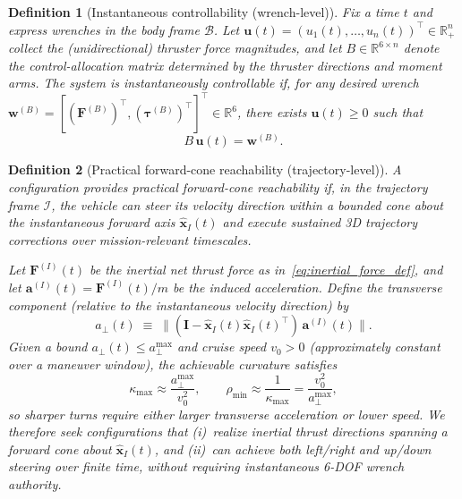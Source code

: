 \documentclass{article}
\newtheorem{definition}{Definition}
\begin{document}
\begin{definition}[Instantaneous controllability (wrench-level)]
\label{def:instant_control}
Fix a time $t$ and express wrenches in the body frame $\mathcal{B}$. Let $\mathbf{u}(t) = (u_1(t), \ldots, u_n(t))^\top \in \mathbb{R}_+^n$ collect the (unidirectional) thruster force magnitudes, and let $B \in \mathbb{R}^{6 \times n}$ denote the control-allocation matrix determined by the thruster directions and moment arms. The system is \emph{instantaneously controllable} if, for any desired wrench $\mathbf{w}^{(B)} = [(\mathbf{F}^{(B)})^\top, (\bm{\tau}^{(B)})^\top]^\top \in \mathbb{R}^6$, there exists $\mathbf{u}(t) \ge 0$ such that
\begin{equation}
B\,\mathbf{u}(t) = \mathbf{w}^{(B)}.
\end{equation}
\end{definition}

\begin{definition}[Practical forward-cone reachability (trajectory-level)]
\label{def:reachability}
A configuration provides \emph{practical forward-cone reachability} if, in the trajectory frame $\mathcal{I}$, the vehicle can steer its velocity direction within a bounded cone about the instantaneous forward axis $\hat{\mathbf{x}}_I(t)$ and execute sustained 3D trajectory corrections over mission-relevant timescales.

Let $\mathbf{F}^{(I)}(t)$ be the inertial net thrust force as in~\eqref{eq:inertial_force_def}, and let $\mathbf{a}^{(I)}(t) = \mathbf{F}^{(I)}(t)/m$ be the induced acceleration. Define the \emph{transverse component} (relative to the instantaneous velocity direction) by
\begin{equation}
a_\perp(t) \;\equiv\; \bigl\|(\mathbf{I} - \hat{\mathbf{x}}_I(t)\hat{\mathbf{x}}_I(t)^\top)\,\mathbf{a}^{(I)}(t)\bigr\|.
\end{equation}
Given a bound $a_\perp(t) \le a_\perp^{\max}$ and cruise speed $v_0 > 0$ (approximately constant over a maneuver window), the achievable curvature satisfies
\begin{equation}
\kappa_{\max} \approx \frac{a_\perp^{\max}}{v_0^2},
\qquad
\rho_{\min} \approx \frac{1}{\kappa_{\max}} = \frac{v_0^2}{a_\perp^{\max}},
\end{equation}
so sharper turns require either larger transverse acceleration or lower speed. We therefore seek configurations that (i)~realize inertial thrust directions spanning a forward cone about $\hat{\mathbf{x}}_I(t)$, and (ii)~can achieve both left/right and up/down steering over finite time, without requiring instantaneous 6-DOF wrench authority.
\end{definition}
\end{document}
